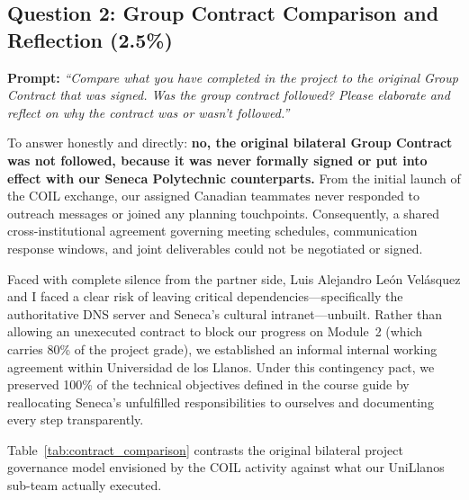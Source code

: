 \subsection{Question 2: Group Contract Comparison and Reflection (2.5\%)}

\begin{tcolorbox}[
    colback=LightPanel,
    colframe=BorderGray,
    boxrule=0.7pt,
    arc=3pt,
    left=9pt,
    right=9pt,
    top=6pt,
    bottom=6pt
]
\textbf{Prompt:} \textit{``Compare what you have completed in the project to the original Group Contract that was signed. Was the group contract followed? Please elaborate and reflect on why the contract was or wasn't followed.''}
\end{tcolorbox}

To answer honestly and directly: \textbf{no, the original bilateral Group Contract was not followed, because it was never formally signed or put into effect with our Seneca Polytechnic counterparts.} From the initial launch of the COIL exchange, our assigned Canadian teammates never responded to outreach messages or joined any planning touchpoints. Consequently, a shared cross-institutional agreement governing meeting schedules, communication response windows, and joint deliverables could not be negotiated or signed.

Faced with complete silence from the partner side, Luis Alejandro Le\'on Vel\'asquez and I faced a clear risk of leaving critical dependencies---specifically the authoritative DNS server and Seneca's cultural intranet---unbuilt. Rather than allowing an unexecuted contract to block our progress on Module~2 (which carries 80\% of the project grade), we established an informal internal working agreement within Universidad de los Llanos. Under this contingency pact, we preserved 100\% of the technical objectives defined in the course guide by reallocating Seneca's unfulfilled responsibilities to ourselves and documenting every step transparently.

Table~\ref{tab:contract_comparison} contrasts the original bilateral project governance model envisioned by the COIL activity against what our UniLlanos sub-team actually executed.

